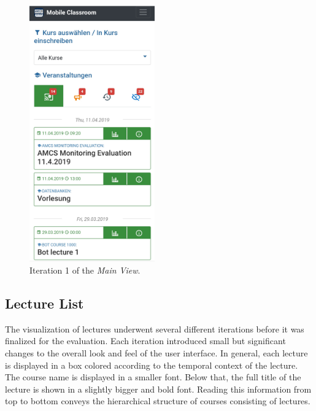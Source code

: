 \begin{figure}
	\vspace*{-2cm}
	\begin{center}
		\includegraphics[width=0.48\textwidth]{screenshots/redesign/main_view_iteration_1.jpg}
	\end{center}
	\caption{Iteration 1 of the \emph{Main View}.}
	\label{fig:main_view:_it1}
	\vspace*{-1.5cm}
\end{figure}

\subsection{Lecture List}
The visualization of lectures underwent several different iterations before it was finalized for the evaluation. Each iteration introduced small but significant changes to the overall look and feel of the user interface.
In general, each lecture is displayed in a box colored according to the temporal context of the lecture.
The course name is displayed in a smaller font. Below that, the full title of the lecture is shown in a slightly bigger and bold font. Reading this information from top to bottom conveys the hierarchical structure of courses consisting of lectures. 

